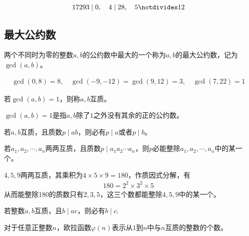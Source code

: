 \begin{example}
  \begin{align*}
    17293\mid 0,\quad 4\mid 28,\quad 5\notdivides 12
  \end{align*}
\end{example}

\subsection{最大公约数}
\label{sec:gcd}

\begin{definition}
  两个不同时为零的整数$a,b$的公约数中最大的一个称为$a,b$的最大公约数，记为$\gcd(a,b)$。
\end{definition}

\begin{example}
  \begin{align*}
    \gcd(0,8)=8,\quad 
    \gcd(-9,-12)=\gcd(9,12)=3,\quad
    \gcd(7,22)=1
  \end{align*}
\end{example}

\begin{definition}[互质，Coprime]
  若$\gcd(a,b)=1$，则称$a,b$互质。
\end{definition}
$\gcd(a,b)=1$是指$a,b$除了$1$之外没有其余的正的公约数。

\begin{theorem}
  若$a,b$互质，且质数$p\mid ab$，则必有$p\mid a$或者$p\mid b$。
\end{theorem}
\begin{corollary}
  若$a_1,a_2,\cdots,a_n$两两互质，且质数$p\mid a_1a_2\cdots a_n$，则$p$必能整除$a_1,a_2,\cdots, a_n$中的某一个。
\end{corollary}

\begin{example}
  $4,5,9$两两互质，其乘积为$4\times5\times9=180$，作质因式分解，有
  \begin{align*}
    180=2^2\times 3^2\times 5
  \end{align*}
  从而能整除$180$的质数只有$2,3,5$，这三个数都能整除$4,5,9$中的某一个。
\end{example}

\begin{theorem}
  若整数$a,b$互质，且$b\mid ac$，则必有$b\mid c.$
\end{theorem}

\begin{definition}\label{def:Euler-function}
  对于任意正整数$n$，欧拉函数$\varphi(n)$表示从$1$到$n$中与$n$互质的整数的个数。
\end{definition}

